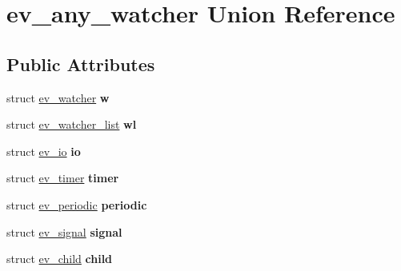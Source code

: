 \hypertarget{unionev__any__watcher}{\section{ev\-\_\-any\-\_\-watcher Union Reference}
\label{unionev__any__watcher}
}
\subsection*{Public Attributes}
\begin{DoxyCompactItemize}
\item 
\hypertarget{unionev__any__watcher_a653eb5db584623c06a3c3d55f5d60020}{struct \hyperlink{structev__watcher}{ev\-\_\-watcher} {\bfseries w}}\label{unionev__any__watcher_a653eb5db584623c06a3c3d55f5d60020}

\item 
\hypertarget{unionev__any__watcher_a92016edfd8481917f988582d3747f273}{struct \hyperlink{structev__watcher__list}{ev\-\_\-watcher\-\_\-list} {\bfseries wl}}\label{unionev__any__watcher_a92016edfd8481917f988582d3747f273}

\item 
\hypertarget{unionev__any__watcher_adf91ee0c0a344e16c3c858a6fe3aacc8}{struct \hyperlink{structev__io}{ev\-\_\-io} {\bfseries io}}\label{unionev__any__watcher_adf91ee0c0a344e16c3c858a6fe3aacc8}

\item 
\hypertarget{unionev__any__watcher_ab4660dcfbdcbff80a395deac1b090eac}{struct \hyperlink{structev__timer}{ev\-\_\-timer} {\bfseries timer}}\label{unionev__any__watcher_ab4660dcfbdcbff80a395deac1b090eac}

\item 
\hypertarget{unionev__any__watcher_a8b400cd8e29a2a7c997100711e8ee8a3}{struct \hyperlink{structev__periodic}{ev\-\_\-periodic} {\bfseries periodic}}\label{unionev__any__watcher_a8b400cd8e29a2a7c997100711e8ee8a3}

\item 
\hypertarget{unionev__any__watcher_a704684338d9105b9a3f1f87e8e48a776}{struct \hyperlink{structev__signal}{ev\-\_\-signal} {\bfseries signal}}\label{unionev__any__watcher_a704684338d9105b9a3f1f87e8e48a776}

\item 
\hypertarget{unionev__any__watcher_a60ac726b969a172eaf42e41dcaf54e81}{struct \hyperlink{structev__child}{ev\-\_\-child} {\bfseries child}}\label{unionev__any__watcher_a60ac726b969a172eaf42e41dcaf54e81}


\end{DoxyCompactItemize}
